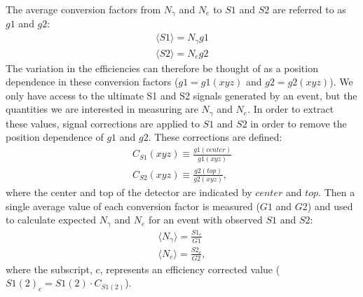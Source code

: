 The average conversion factors from $N_{\gamma}$ and $N_e$ to $S1$ and $S2$ are referred to as $g1$ and $g2$:
\begin{equation}\label{eq:krypcal1}
\begin{split}
\langle S1 \rangle = N_{\gamma}g1\\
\langle S2 \rangle = N_e g2
\end{split}
\end{equation}
The variation in the efficiencies can therefore be thought of as a position dependence in these conversion factors ($g1=g1(xyz)$ and $g2=g2(xyz)$). We only have access to the ultimate S1 and S2 signals generated by an event, but the quantities we are interested in measuring are $N{_\gamma}$ and $N_e$. In order to extract these values, signal corrections are applied to $S1$ and $S2$ in order to remove the position dependence of $g1$ and $g2$. These corrections are defined:
\begin{equation}\label{eq:krypcal2}
\begin{split}
C_{S1}(xyz) \equiv \frac{g1(center)}{g1(xyz)}\\[1em]
C_{S2}(xyz)\equiv \frac{g2(top)}{g2(xyz)},
\end{split}
\end{equation}
where the center and top of the detector are indicated by $center$ and $top$. Then a single average value of each conversion factor is measured ($G1$ and $G2$) and used to calculate expected $N_{\gamma}$ and $N_e$ for an event with observed $S1$ and $S2$:
\begin{equation}
\begin{split}
\langle N_{\gamma} \rangle = \frac{S1_c}{G1}\\[1em]
\langle N_e \rangle = \frac{S2_c}{G2},
\end{split}
\end{equation}
where the subscript, $c$, represents an efficiency corrected value ($S1(2)_c=S1(2)\cdot C_{S1(2)}$).

